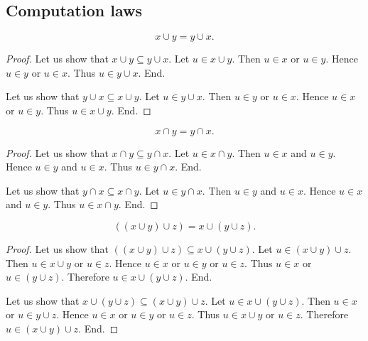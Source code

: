 \documentclass[../../sets-and-functions.ftl.tex]{subfiles}
\begin{document}
  \subsection{Computation laws}

  \begin{forthel}
    \begin{proposition}[SF 01 01 830899]
      $$x \cup y = y \cup x.$$
    \end{proposition}
    \begin{proof}
      Let us show that $x \cup y \subseteq y \cup x$.
        Let $u \in x \cup y$.
        Then $u \in x$ or $u \in y$.
        Hence $u \in y$ or $u \in x$.
        Thus $u \in y \cup x$.
      End.

      Let us show that $y \cup x \subseteq x \cup y$.
        Let $u \in y \cup x$.
        Then $u \in y$ or $u \in x$.
        Hence $u \in x$ or $u \in y$.
        Thus $u \in x \cup y$.
      End.
    \end{proof}


    \begin{proposition}[SF 01 01 728823]
      $$x \cap y = y \cap x.$$
    \end{proposition}
    \begin{proof}
      Let us show that $x \cap y \subseteq y \cap x$.
        Let $u \in x \cap y$.
        Then $u \in x$ and $u \in y$.
        Hence $u \in y$ and $u \in x$.
        Thus $u \in y \cap x$.
      End.

      Let us show that $y \cap x \subseteq x \cap y$.
        Let $u \in y \cap x$.
        Then $u \in y$ and $u \in x$.
        Hence $u \in x$ and $u \in y$.
        Thus $u \in x \cap y$.
      End.
    \end{proof}

    \begin{proposition}[SF 01 01 665069]
      $$((x \cup y) \cup z) = x \cup (y \cup z).$$
    \end{proposition}
    \begin{proof}
      Let us show that $((x \cup y) \cup z) \subseteq x \cup (y \cup z)$.
        Let $u \in (x \cup y) \cup z$.
        Then $u \in x \cup y$ or $u \in z$.
        Hence $u \in x$ or $u \in y$ or $u \in z$.
        Thus $u \in x$ or $u \in (y \cup z)$.
        Therefore $u \in x \cup (y \cup z)$.
      End.

      Let us show that $x \cup (y \cup z) \subseteq (x \cup y) \cup z$.
        Let $u \in x \cup (y \cup z)$.
        Then $u \in x$ or $u \in y \cup z$.
        Hence $u \in x$ or $u \in y$ or $u \in z$.
        Thus $u \in x \cup y$ or $u \in z$.
        Therefore $u \in (x \cup y) \cup z$.
      End.
    \end{proof}



\end{forthel}
\end{document}
